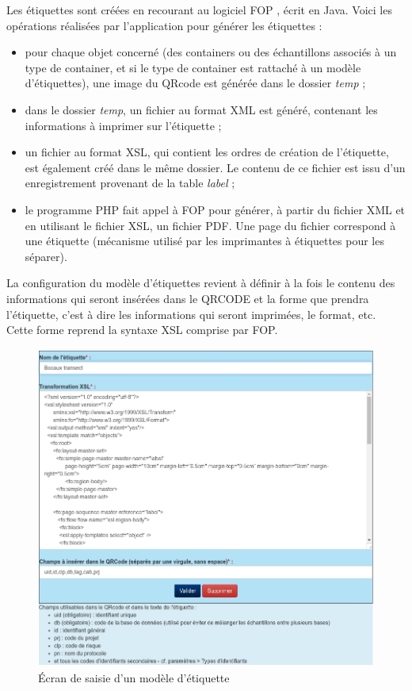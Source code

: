 Les étiquettes sont créées en recourant au logiciel FOP \cite{fop}, écrit en Java. Voici les opérations réalisées par l'application pour générer les étiquettes :
\begin{itemize}
\item pour chaque objet concerné (des containers ou des échantillons associés à un type de container, et si le type de container est rattaché à un modèle d'étiquettes), une image du QRcode est générée dans le dossier \textit{temp} ;
\item dans le dossier \textit{temp}, un fichier au format XML est généré, contenant les informations à imprimer sur l'étiquette ;
\item un fichier au format XSL, qui contient les ordres de création de l'étiquette, est également créé dans le même dossier. Le contenu de ce fichier est issu d'un enregistrement provenant de la table \textit{label} ;
\item le programme PHP fait appel à FOP pour générer, à partir du fichier XML et en utilisant le fichier XSL, un fichier PDF. Une page du fichier correspond à une étiquette (mécanisme utilisé par les imprimantes à étiquettes pour les séparer).
\end{itemize}

La configuration du modèle d'étiquettes revient à définir à la fois le contenu des informations qui seront insérées dans le QRCODE et la forme que prendra l'étiquette, c'est à dire les informations qui seront imprimées, le format, etc. Cette forme reprend la syntaxe XSL comprise par FOP.

\begin{figure}[H]
\includegraphics[width=\linewidth]{images/label}
\caption{Écran de saisie d'un modèle d'étiquette}
\end{figure}

